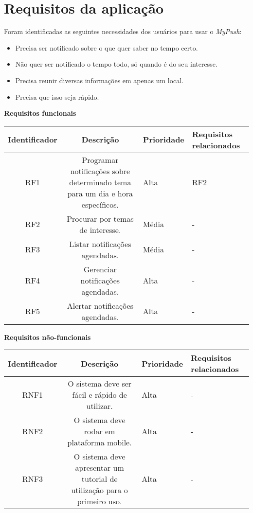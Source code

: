 \chapter{Requisitos da aplicação}

Foram identificadas as seguintes necessidades dos usuários para usar o \textit{MyPush}:

\begin{itemize}
 \item Precisa ser notificado sobre o que quer saber no tempo certo.
 \item Não quer ser notificado o tempo todo, só quando é do seu interesse.
 \item Precisa reunir diversas informações em apenas um local.
 \item Precisa que isso seja rápido.
\end{itemize}

\textbf{Requisitos funcionais}

\begin{table}[h]
\centering
\begin{tabular}{|c|c|p{6cm}|p{5cm}|}

\hline
\textbf{Identificador} & \textbf{Descrição} & \textbf{Prioridade} & \textbf{Requisitos relacionados}\\
\hline                               
RF1 & Programar notificações sobre determinado tema para um dia e hora específicos. & Alta & RF2\\
\hline
RF2 & Procurar por temas de interesse. & Média & -\\
\hline
RF3 & Listar notificações agendadas. & Média & -\\
\hline
RF4 & Gerenciar notificações agendadas. & Alta & -\\
\hline
RF5 & Alertar notificações agendadas. & Alta & -\\
\hline
\end{tabular}
\end{table}

\textbf{Requisitos não-funcionais}

\begin{table}[h]
\centering
\begin{tabular}{|c|c|p{6cm}|p{5cm}|}

\hline
\textbf{Identificador} & \textbf{Descrição} & \textbf{Prioridade} & \textbf{Requisitos relacionados}\\
\hline                               
RNF1 & O sistema deve ser fácil e rápido de utilizar. & Alta & -\\
\hline
RNF2 & O sistema deve rodar em plataforma mobile. & Alta & -\\
\hline
RNF3 & O sistema deve apresentar um tutorial de utilização para o primeiro uso. & Alta & -\\
\hline
\end{tabular}
\end{table}
